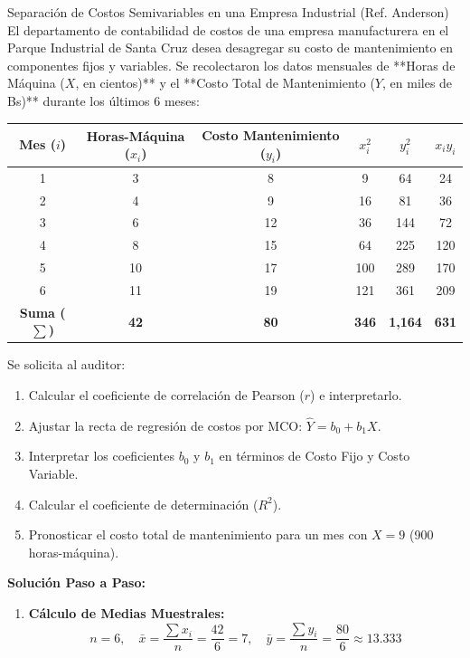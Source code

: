 \begin{casocontable}{Separación de Costos Semivariables en una Empresa Industrial (Ref. Anderson)}
El departamento de contabilidad de costos de una empresa manufacturera en el Parque Industrial de Santa Cruz desea desagregar su costo de mantenimiento en componentes fijos y variables. Se recolectaron los datos mensuales de **Horas de Máquina ($X$, en cientos)** y el **Costo Total de Mantenimiento ($Y$, en miles de Bs)** durante los últimos 6 meses:

\begin{center}
\small
\begin{tabular}{c|cc|ccc}
\toprule
\textbf{Mes ($i$)} & \textbf{Horas-Máquina ($x_i$)} & \textbf{Costo Mantenimiento ($y_i$)} & $x_i^2$ & $y_i^2$ & $x_i y_i$ \\
\midrule
1 & 3 & 8 & 9 & 64 & 24 \\
2 & 4 & 9 & 16 & 81 & 36 \\
3 & 6 & 12 & 36 & 144 & 72 \\
4 & 8 & 15 & 64 & 225 & 120 \\
5 & 10 & 17 & 100 & 289 & 170 \\
6 & 11 & 19 & 121 & 361 & 209 \\
\midrule
\textbf{Suma ($\sum$)} & \textbf{42} & \textbf{80} & \textbf{346} & \textbf{1,164} & \textbf{631} \\
\bottomrule
\end{tabular}
\end{center}

Se solicita al auditor:
\begin{enumerate}
    \item Calcular el coeficiente de correlación de Pearson ($r$) e interpretarlo.
    \item Ajustar la recta de regresión de costos por MCO: $\hat{Y} = b_0 + b_1 X$.
    \item Interpretar los coeficientes $b_0$ y $b_1$ en términos de Costo Fijo y Costo Variable.
    \item Calcular el coeficiente de determinación ($R^2$).
    \item Pronosticar el costo total de mantenimiento para un mes con $X = 9$ (900 horas-máquina).
\end{enumerate}

\tcbline
\textbf{Solución Paso a Paso:}
\begin{enumerate}
    \item \textbf{Cálculo de Medias Muestrales:}
    \[
    n = 6, \quad \bar{x} = \frac{\sum x_i}{n} = \frac{42}{6} = 7, \quad \bar{y} = \frac{\sum y_i}{n} = \frac{80}{6} \approx 13.333
    \]
    

\end{enumerate}
\end{casocontable}
